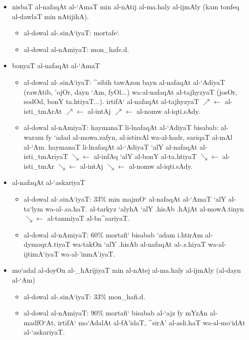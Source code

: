 \begin{itemize}
    \item nisbaT al-nafaqAt al-`AmaT min al-nAtij al-ma.haly al-ijmAly (kam
        tonfeq al-dawlaT min nAtijihA).
    \begin{itemize}
        \item al-dowal al-.sinA`iyaT: mortafe`.
        \item al-dowal al-nAmiyaT: mon_hafe.d.
    \end{itemize}

    \item bonyaT al-nafaqAt al-`AmaT
    \begin{itemize}
        \item al-dowal al-.sinA`iyaT: ^sibih tawAzon bayn al-nafaqAt al-`AdiyaT
            (rawAtib, 'ojOr, dayn `Am, fyOl...) wa-al-nafaqAt al-tajhyzyaT
            (josOr, sodOd, bonY ta.htiyaT...).
            \smallskip
            irtifA` al-nafaqAt al-tajhyzyaT
            $\nearrow\leftarrow$ al-isti_tmArAt
            $\nearrow\leftarrow$ al-intAj
            $\nearrow\leftarrow$ al-nomw al-iqti.sAdy.
        \item al-dowal al-nAmiyaT: haymanaT li-lnafaqAt al-`AdiyaT bisabab: 
            al-waram fy `adad al-mowa.zafyn, al-istirsAl wa-al-hadr, sariqaT
            al-mAl al-`Am.
            \smallskip
            haymanaT li-lnafaqAt al-`AdiyaT `alY al-nafaqAt al-isti_tmAriyaT
            $\searrow\leftarrow$ al-infAq `alY al-bonY al-ta.htiyaT
            $\searrow\leftarrow$ al-isti_tmAr
            $\searrow\leftarrow$ al-intAj
            $\searrow\leftarrow$ al-nomw al-iqti.sAdy.
    \end{itemize}
    
    \item al-nafaqAt al-`askariyaT
    \begin{itemize}
        \item al-dowal al-.sinA`iyaT: 33\% min majmO` al-nafaqAt al-`AmaT `alY
            al-ta`lym wa-al-.sa.haT.
            \smallskip
            al-tarkyz `alyhA `alY .hisAb .hAjAt al-mowA.tinyn
            $\searrow\leftarrow$ al-tanmiyaT al-ba^sariyaT.
        \item al-dowal al-nAmiyaT: 60\% mortafi` bisabab `adam i.htirAm
            al-dymoqrA.tiyaT wa-takOn `alY .hisAb al-nafaqAt al-.s.hiyaT
            wa-al-ijtimA`iyaT wa-al-'inmA'iyaT.
    \end{itemize}

    \item mo`adal al-doyOn al-_hArijiyaT min al-nAtej al-ma.haly al-ijmAly
        (al-dayn al-`Am)
    \begin{itemize}
        \item al-dowal al-.sinA`iyaT: 33\% mon_hafi.d.
        \item al-dowal al-nAmiyaT: 90\% mortafi` bisabab al-`ajz fy mYzAn
            al-madfO`At, irtifA` mo`AdalAt al-fA'idaT, ^sirA' al-asli.haT
            wa-al-mo`idAt al-`askariyaT.
    \end{itemize}

\end{itemize}
